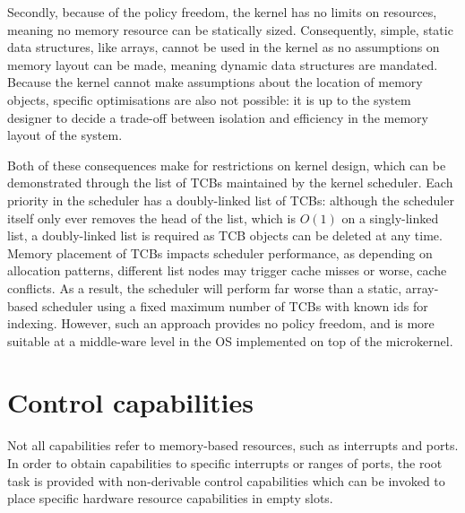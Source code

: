 Secondly, because of the policy freedom, the kernel has no limits on resources, meaning no memory
resource can be statically sized. Consequently, simple, static data structures, like arrays, cannot
be used in the kernel as no assumptions on memory layout can be made, meaning dynamic data
structures are mandated. Because the kernel cannot make assumptions about the location of memory
objects, specific optimisations are also not possible: it is up to the system designer to decide a trade-off
between isolation and efficiency in the memory layout of the system.

Both of these consequences make for restrictions on kernel design, which can be demonstrated through
the list of TCBs maintained by the kernel scheduler. Each priority in the scheduler has a
doubly-linked list of TCBs: although the scheduler itself only ever removes the head of the list,
which is $O(1)$ on a singly-linked list, a doubly-linked list is required as TCB objects can be
deleted at any time. Memory placement of TCBs impacts scheduler performance, as depending on
allocation patterns, different list nodes may trigger cache misses or worse, cache conflicts. As a
result, the scheduler will perform far worse than a static, array-based scheduler using a fixed
maximum number of TCBs with known ids for indexing. However, such an approach provides no policy
freedom, and is more suitable at a middle-ware level in the \gls{OS} implemented on top of the
microkernel. 

\section{Control capabilities}
\label{s:control-capabilities}

Not all capabilities refer to memory-based resources, such as interrupts and \IO ports.
In order to obtain capabilities to specific interrupts or ranges of \IO ports, the root task is
provided with non-derivable control capabilities which can be invoked to place specific hardware
resource capabilities in empty slots.

